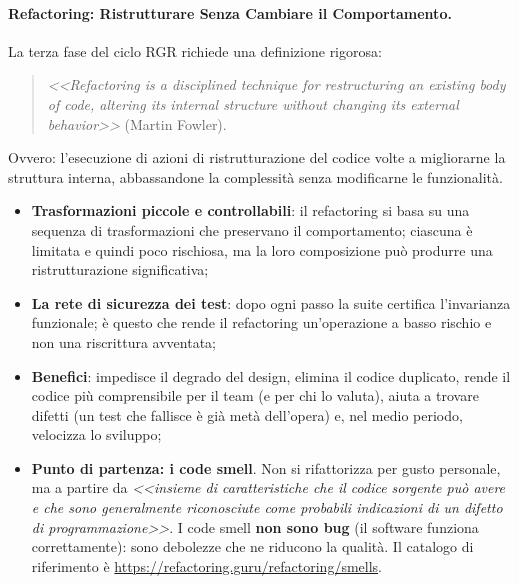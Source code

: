 \documentclass[12pt]{extarticle}
\begin{document}
\paragraph{Refactoring: Ristrutturare Senza Cambiare il Comportamento.}
La terza fase del ciclo RGR richiede una definizione rigorosa:
\begin{quote}
    \textit{<<Refactoring is a disciplined technique for restructuring an existing body of code, altering its internal structure without changing its external behavior>>} (Martin Fowler).
\end{quote}
\noindent Ovvero: l'esecuzione di azioni di ristrutturazione del codice volte a migliorarne la struttura interna, abbassandone la complessità senza modificarne le funzionalità.
\begin{itemize}
    \item \textbf{Trasformazioni piccole e controllabili}: il refactoring si basa su una sequenza di trasformazioni che preservano il comportamento; ciascuna è limitata e quindi poco rischiosa, ma la loro composizione può produrre una ristrutturazione significativa;
    \item \textbf{La rete di sicurezza dei test}: dopo ogni passo la suite certifica l'invarianza funzionale; è questo che rende il refactoring un'operazione a basso rischio e non una riscrittura avventata;
    \item \textbf{Benefici}: impedisce il degrado del design, elimina il codice duplicato, rende il codice più comprensibile per il team (e per chi lo valuta), aiuta a trovare difetti (un test che fallisce è già metà dell'opera) e, nel medio periodo, velocizza lo sviluppo;
    \item \textbf{Punto di partenza: i code smell}. Non si rifattorizza per gusto personale, ma a partire da \textit{<<insieme di caratteristiche che il codice sorgente può avere e che sono generalmente riconosciute come probabili indicazioni di un difetto di programmazione>>}. I code smell \textbf{non sono bug} (il software funziona correttamente): sono debolezze che ne riducono la qualità. Il catalogo di riferimento è \url{https://refactoring.guru/refactoring/smells}.
\end{itemize}
\end{document}
